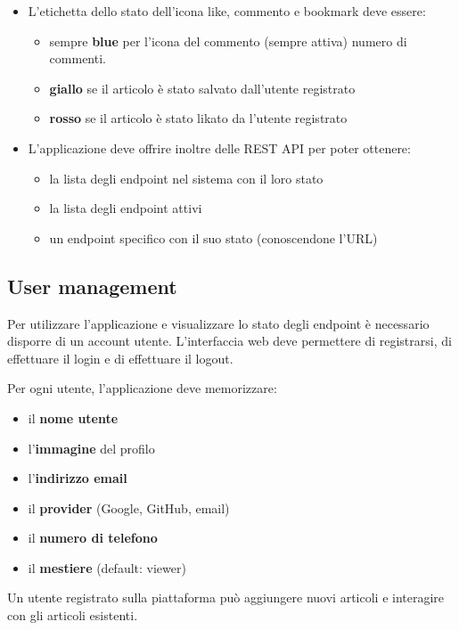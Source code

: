 \documentclass{article}
\begin{document}
\begin{itemize}
    \item L'etichetta dello stato dell'icona like, commento e bookmark deve essere:
    \begin{itemize}
        \item sempre \textbf{blue} per l'icona del commento (sempre attiva) numero di commenti.
        \item \textbf{giallo} se il articolo è stato salvato dall'utente registrato
        \item \textbf{rosso} se il articolo è stato likato da l'utente registrato
    \end{itemize}
    \item L'applicazione deve offrire inoltre delle REST API per poter ottenere:
    \begin{itemize}
        \item la lista degli endpoint nel sistema con il loro stato
        \item la lista degli endpoint attivi
        \item un endpoint specifico con il suo stato (conoscendone l'URL)
    \end{itemize}
\end{itemize}

\subsection{User management}

Per utilizzare l'applicazione e visualizzare lo stato degli endpoint è necessario disporre di un account utente.
L'interfaccia web deve permettere di registrarsi, di effettuare il login e di effettuare il logout.

Per ogni utente, l'applicazione deve memorizzare:
\begin{itemize}
    \item il \textbf{nome utente}
    \item l'\textbf{immagine} del profilo
    \item l'\textbf{indirizzo email}
    \item il \textbf{provider} (Google, GitHub, email)
    \item il \textbf{numero di telefono}
    \item il \textbf{mestiere} (default: viewer)
\end{itemize}

Un utente registrato sulla piattaforma può aggiungere nuovi articoli e interagire con gli articoli esistenti.

\clearpage
\end{document}
